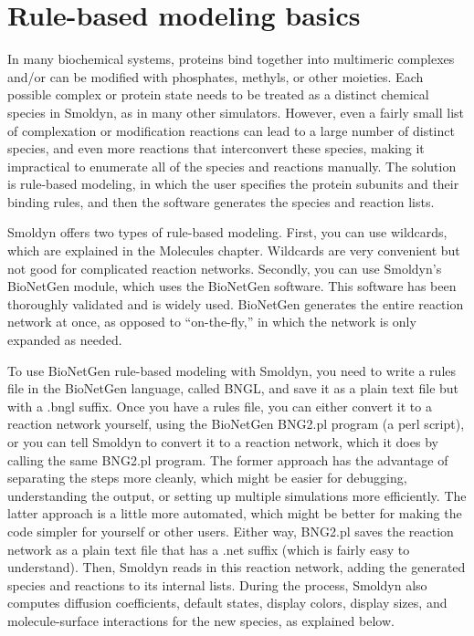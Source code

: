 \documentclass {scrbook}
\begin{document}
\section{Rule-based modeling basics}

In many biochemical systems, proteins bind together into multimeric complexes and/or can be modified with phosphates, methyls, or other moieties. Each possible complex or protein state needs to be treated as a distinct chemical species in Smoldyn, as in many other simulators. However, even a fairly small list of complexation or modification reactions can lead to a large number of distinct species, and even more reactions that interconvert these species, making it impractical to enumerate all of the species and reactions manually. The solution is rule-based modeling, in which the user specifies the protein subunits and their binding rules, and then the software generates the species and reaction lists.

Smoldyn offers two types of rule-based modeling. First, you can use wildcards, which are explained in the Molecules chapter. Wildcards are very convenient but not good for complicated reaction networks. Secondly, you can use Smoldyn's BioNetGen module, which uses the BioNetGen software. This software has been thoroughly validated and is widely used. BioNetGen generates the entire reaction network at once, as opposed to ``on-the-fly,'' in which the network is only expanded as needed.

To use BioNetGen rule-based modeling with Smoldyn, you need to write a rules file in the BioNetGen language, called BNGL, and save it as a plain text file but with a .bngl suffix. Once you have a rules file, you can either convert it to a reaction network yourself, using the BioNetGen BNG2.pl program (a perl script), or you can tell Smoldyn to convert it to a reaction network, which it does by calling the same BNG2.pl program. The former approach has the advantage of separating the steps more cleanly, which might be easier for debugging, understanding the output, or setting up multiple simulations more efficiently. The latter approach is a little more automated, which might be better for making the code simpler for yourself or other users. Either way, BNG2.pl saves the reaction network as a plain text file that has a .net suffix (which is fairly easy to understand). Then, Smoldyn reads in this reaction network, adding the generated species and reactions to its internal lists. During the process, Smoldyn also computes diffusion coefficients, default states, display colors, display sizes, and molecule-surface interactions for the new species, as explained below.
\end{document}
